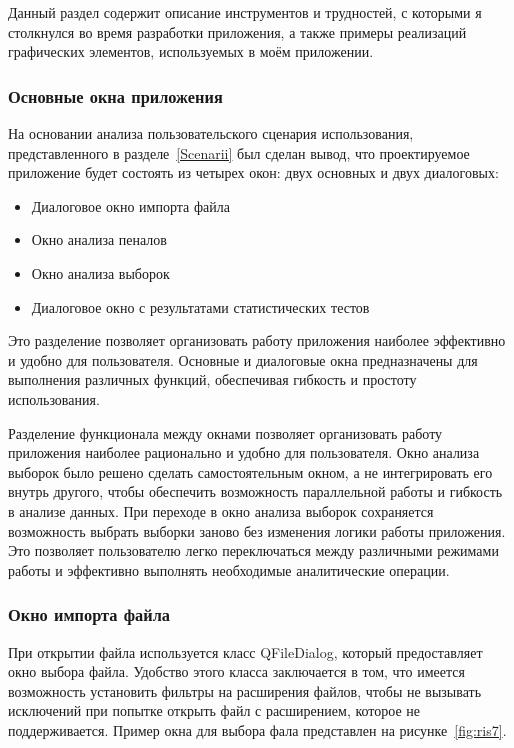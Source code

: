 Данный раздел содержит описание инструментов и трудностей, с которыми я столкнулся во время разработки приложения, а также примеры реализаций графических элементов, используемых в моём приложении.

\subsubsection{Основные окна приложения}

На основании анализа пользовательского сценария использования, представленного в разделе~\ref{Scenarii} был сделан вывод, что проектируемое приложение будет состоять из четырех окон: двух основных и двух диалоговых:

\begin{itemize}
	\item Диалоговое окно импорта файла
	\item Окно анализа пеналов
	\item Окно анализа выборок
	\item Диалоговое окно с результатами статистических тестов 
\end{itemize}

Это разделение позволяет организовать работу приложения наиболее эффективно и удобно для пользователя. Основные и диалоговые окна предназначены для выполнения различных функций, обеспечивая гибкость и простоту использования.

Разделение функционала между окнами позволяет организовать работу приложения наиболее рационально и удобно для пользователя. Окно анализа выборок было решено сделать самостоятельным окном, а не интегрировать его внутрь другого, чтобы обеспечить возможность параллельной работы и гибкость в анализе данных. При переходе в окно анализа выборок сохраняется возможность выбрать выборки заново без изменения логики работы приложения. Это позволяет пользователю легко переключаться между различными режимами работы и эффективно выполнять необходимые аналитические операции.

\subsubsection{Окно импорта файла}

При открытии файла используется класс QFileDialog, который предоставляет окно выбора файла. Удобство этого класса заключается в том, что имеется возможность установить фильтры на расширения файлов, чтобы не вызывать исключений при попытке открыть файл с расширением, которое не поддерживается. Пример окна для выбора фала представлен на рисунке~\ref{fig:ris7}.


